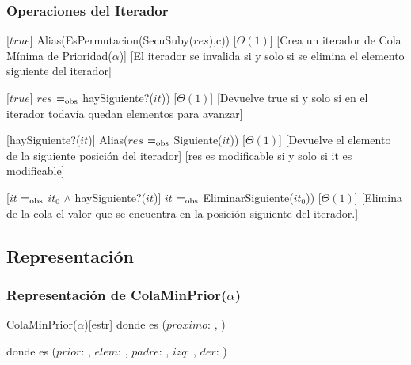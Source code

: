 \subsubsection{Operaciones del Iterador}

	[$true$]
	{Alias(EsPermutacion(SecuSuby($res$),c))}
	[$\Theta(1)$]
	[Crea un iterador de Cola Mínima de Prioridad($\alpha$)]
	[El iterador se invalida si y solo si se elimina el elemento siguiente del iterador]

	[$true$]
	{$res$ $=_{\mathrm{obs}}$ haySiguiente?($it$))}
	[$\Theta(1)$]
	[Devuelve true si y solo si en el iterador todavía quedan elementos para avanzar]

	[haySiguiente?($it$)]
	{Alias($res$ $=_{\mathrm{obs}}$ Siguiente($it$))}
	[$\Theta(1)$]
	[Devuelve el elemento de la siguiente posición del iterador]
	[res es modificable si y solo si it es modificable]

	[$it$ $=_{\mathrm{obs}}$ $it_0$ $\wedge$ haySiguiente?($it$)]
	{$it$ $=_{\mathrm{obs}}$ EliminarSiguiente($it_0$))}
	[$\Theta(1)$]
	[Elimina de la cola el valor que se encuentra en la posición siguiente del iterador.]
	
\subsection{Representación}

	\subsubsection{Representación de ColaMinPrior($\alpha$)}

		\begin{Estructura}{ColaMinPrior($\alpha$)}[estr]
			\- \- \- \- donde  es ($proximo$: ,
			)
			
			\- \- \- \- donde  es ($prior$: , $elem$: \TipoVariable{$\alpha$}, $padre$: , $izq$: , $der$: )
			
		\end{Estructura}

